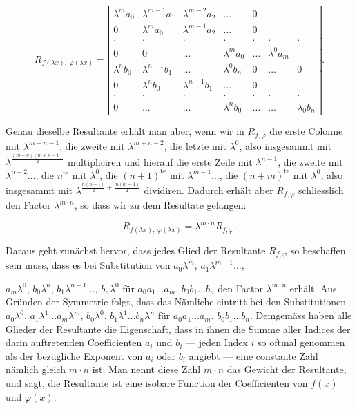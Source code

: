 \[
R_{f(\lambda x),\ \varphi(\lambda x)} =
\left|
\begin{array}{ccccccc}
\lambda^m a_0 & \lambda^{m-1}a_1 & \lambda^{m-2}a_2 & \ldots & 0 \\
0 & \lambda^m a_0 & \lambda^{m-1}a_2 & \ldots & 0 \\
\cdot & \cdot & \cdot & \cdot & \cdot & \cdot & \cdot \\
0 & 0 & \ldots & \lambda^m a_0 & \ldots & \lambda^0 a_m \\
\lambda^n b_0 & \lambda^{n-1}b_1 & \ldots & \lambda^0 b_n & 0 & \ldots & 0 \\
0 & \lambda^n b_0 & \lambda^{n-1}b_1 & \ldots & 0 \\
\cdot & \cdot & \cdot & \cdot & \cdot & \cdot & \cdot \\
0 & \ldots & \ldots & \lambda^n b_0 & \ldots & \ldots & \lambda_0 b_n
\end{array}
\right| .
\]

Genau dieselbe Resultante erh\"alt man aber, wenn wir in $R_{f,\varphi}$ die erste Colonne
mit $\lambda^{m+n-1}$, die zweite mit $\lambda^{m+n-2}$, die letzte mit $\lambda^0$, also
insgesammt mit $\lambda^{\frac{(m+n)(m+n-1)}{2}}$ multipliciren und hierauf die erste Zeile
mit $\lambda^{n-1}$, die zweite mit $\lambda^{n-2}\ldots$, die $n^{\text{te}}$ mit $\lambda^0$,
die $(n+1)^{\text{te}}$ mit $\lambda^{m-1}\ldots$, die $(n+m)^{\text{te}}$ mit $\lambda^0$,
also insgesammt mit $\lambda^{\frac{n(n-1)}{2}+\frac{m(m-1)}{2}}$ dividiren. Dadurch erh\"alt
aber $R_{f,\varphi}$ schliesslich den Factor $\lambda^{m\cdot n}$, so dass wir zu dem
Resultate gelangen:

\[ R_{f(\lambda x),\ \varphi(\lambda x)} = \lambda^{m\cdot n} R_{f,\varphi}. \]

Daraus geht zun\"achst hervor, dass jedes Glied der Resultante $R_{f,\varphi}$ so beschaffen
sein muss, dass es bei Substitution von $a_0\lambda^m$, $a_1\lambda^{m-1}\ldots$,


$a_m\lambda^0$, $b_0\lambda^n$, $b_1\lambda^{n-1}\ldots$, $b_n\lambda^0$ f\"ur
$a_0a_1\ldots a_m$, $b_0b_1\ldots b_n$ den Factor $\lambda^{m\cdot n}$ erh\"alt. Aus
Gr\"unden der Symmetrie folgt, dass das N\"amliche eintritt bei den Substitutionen
$a_0\lambda^0$, $a_1\lambda^1\ldots a_m\lambda^m$, $b_0\lambda^0$, $b_1\lambda^1\ldots
b_n\lambda^n$ f\"ur $a_0a_1\ldots a_m$, $b_0b_1\ldots b_n$. Demgem\"ass haben alle Glieder der
Resultante die Eigenschaft, dass in ihnen die Summe aller Indices der darin auftretenden
Coefficienten $a_i$ und $b_i$ --- jeden Index $i$ so oftmal genommen als der bez\"ugliche
Exponent von $a_i$ oder $b_i$ angiebt --- eine constante Zahl n\"amlich gleich $m\cdot n$
ist. Man nennt diese Zahl $m\cdot n$ das Gewicht der Resultante, und sagt, die Resultante
ist eine isobare Function der Coefficienten von $f(x)$ und $\varphi(x)$.

